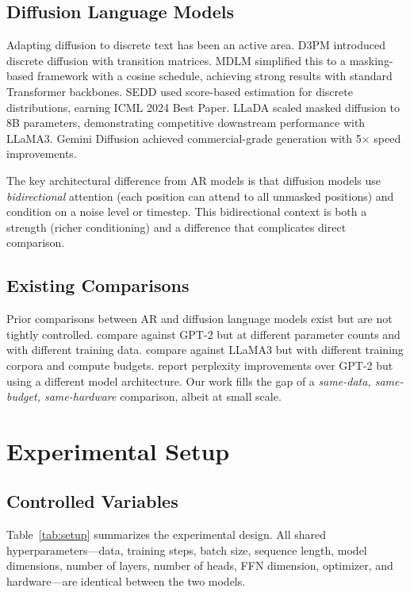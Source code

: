 \documentclass[11pt,a4paper]{article}
\begin{document}
\subsection{Diffusion Language Models}

Adapting diffusion to discrete text has been an active area.
D3PM \citep{austin2021d3pm} introduced discrete diffusion with transition matrices.
MDLM \citep{mdlm} simplified this to a masking-based framework with a cosine schedule, achieving strong results with standard Transformer backbones.
SEDD \citep{sedd} used score-based estimation for discrete distributions, earning ICML 2024 Best Paper.
LLaDA \citep{llada} scaled masked diffusion to 8B parameters, demonstrating competitive downstream performance with LLaMA3.
Gemini Diffusion \citep{geminidiffusion} achieved commercial-grade generation with 5$\times$ speed improvements.

The key architectural difference from AR models is that diffusion models use \emph{bidirectional} attention (each position can attend to all unmasked positions) and condition on a noise level or timestep.
This bidirectional context is both a strength (richer conditioning) and a difference that complicates direct comparison.

\subsection{Existing Comparisons}

Prior comparisons between AR and diffusion language models exist but are not tightly controlled.
\citet{mdlm} compare against GPT-2 but at different parameter counts and with different training data.
\citet{llada} compare against LLaMA3 but with different training corpora and compute budgets.
\citet{sedd} report perplexity improvements over GPT-2 but using a different model architecture.
Our work fills the gap of a \emph{same-data, same-budget, same-hardware} comparison, albeit at small scale.

\section{Experimental Setup}

\subsection{Controlled Variables}

Table~\ref{tab:setup} summarizes the experimental design.
All shared hyperparameters---data, training steps, batch size, sequence length, model dimensions, number of layers, number of heads, FFN dimension, optimizer, and hardware---are identical between the two models.
\end{document}
